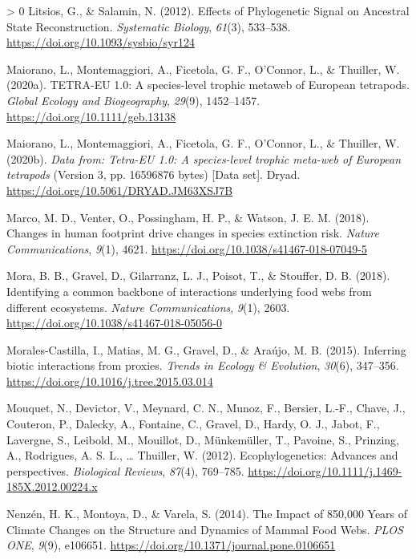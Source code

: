 \documentclass[10pt,oneside]{article}
\newlength{\cslhangindent}
\newenvironment{CSLReferences}[3] %
 {%
  \setlength{\parindent}{0pt}
  \ifodd #1 \everypar{\setlength{\hangindent}{\cslhangindent}}\ignorespaces\fi
  \ifnum #2 > 0
  \setlength{\parskip}{#2\baselineskip}
  \fi
 }%
 {}
\begin{document}
\begin{CSLReferences}{1}{0}
\leavevmode\hypertarget{ref-Litsios2012EffPhy}{}%
Litsios, G., \& Salamin, N. (2012). Effects of Phylogenetic Signal on
Ancestral State Reconstruction. \emph{Systematic Biology}, \emph{61}(3),
533--538. \url{https://doi.org/10.1093/sysbio/syr124}

\leavevmode\hypertarget{ref-Maiorano2020Tet10}{}%
Maiorano, L., Montemaggiori, A., Ficetola, G. F., O'Connor, L., \&
Thuiller, W. (2020a). TETRA-EU 1.0: A species-level trophic metaweb of
European tetrapods. \emph{Global Ecology and Biogeography},
\emph{29}(9), 1452--1457. \url{https://doi.org/10.1111/geb.13138}

\leavevmode\hypertarget{ref-Maiorano2020DatTet}{}%
Maiorano, L., Montemaggiori, A., Ficetola, G. F., O'Connor, L., \&
Thuiller, W. (2020b). \emph{Data from: Tetra-EU 1.0: A species-level
trophic meta-web of European tetrapods} (Version 3, pp. 16596876 bytes)
{[}Data set{]}. Dryad. \url{https://doi.org/10.5061/DRYAD.JM63XSJ7B}

\leavevmode\hypertarget{ref-Marco2018ChaHum}{}%
Marco, M. D., Venter, O., Possingham, H. P., \& Watson, J. E. M. (2018).
Changes in human footprint drive changes in species extinction risk.
\emph{Nature Communications}, \emph{9}(1), 4621.
\url{https://doi.org/10.1038/s41467-018-07049-5}

\leavevmode\hypertarget{ref-Mora2018IdeCom}{}%
Mora, B. B., Gravel, D., Gilarranz, L. J., Poisot, T., \& Stouffer, D.
B. (2018). Identifying a common backbone of interactions underlying food
webs from different ecosystems. \emph{Nature Communications},
\emph{9}(1), 2603. \url{https://doi.org/10.1038/s41467-018-05056-0}

\leavevmode\hypertarget{ref-Morales-Castilla2015InfBio}{}%
Morales-Castilla, I., Matias, M. G., Gravel, D., \& Araújo, M. B.
(2015). Inferring biotic interactions from proxies. \emph{Trends in
Ecology \& Evolution}, \emph{30}(6), 347--356.
\url{https://doi.org/10.1016/j.tree.2015.03.014}

\leavevmode\hypertarget{ref-Mouquet2012EcoAdv}{}%
Mouquet, N., Devictor, V., Meynard, C. N., Munoz, F., Bersier, L.-F.,
Chave, J., Couteron, P., Dalecky, A., Fontaine, C., Gravel, D., Hardy,
O. J., Jabot, F., Lavergne, S., Leibold, M., Mouillot, D., Münkemüller,
T., Pavoine, S., Prinzing, A., Rodrigues, A. S. L., \ldots{} Thuiller,
W. (2012). Ecophylogenetics: Advances and perspectives. \emph{Biological
Reviews}, \emph{87}(4), 769--785.
\url{https://doi.org/10.1111/j.1469-185X.2012.00224.x}

\leavevmode\hypertarget{ref-Nenzen2014Imp850}{}%
Nenzén, H. K., Montoya, D., \& Varela, S. (2014). The Impact of 850,000
Years of Climate Changes on the Structure and Dynamics of Mammal Food
Webs. \emph{PLOS ONE}, \emph{9}(9), e106651.
\url{https://doi.org/10.1371/journal.pone.0106651}


\end{CSLReferences}
\end{document}
